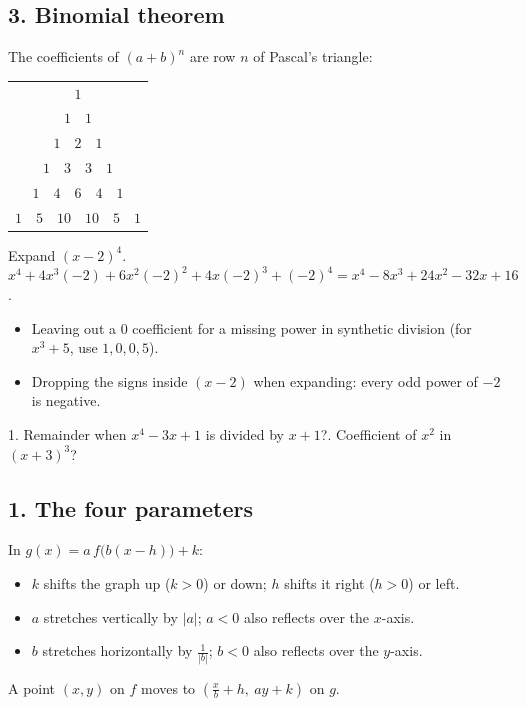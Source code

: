 \subsection*{3. Binomial theorem}
The coefficients of $(a+b)^n$ are row $n$ of Pascal's triangle:
\begin{center}\small
\begin{tabular}{c}
$1$\\ $1\quad1$\\ $1\quad2\quad1$\\ $1\quad3\quad3\quad1$\\ $1\quad4\quad6\quad4\quad1$\\ $1\quad5\quad10\quad10\quad5\quad1$
\end{tabular}
\end{center}
\begin{example}[Example 2]
Expand $(x-2)^4$.
\sol $x^4+4x^3(-2)+6x^2(-2)^2+4x(-2)^3+(-2)^4=x^4-8x^3+24x^2-32x+16$.
\end{example}

\begin{mistakes}
\begin{itemize}
\item Leaving out a $0$ coefficient for a missing power in synthetic division (for $x^3+5$, use $1,0,0,5$).
\item Dropping the signs inside $(x-2)$ when expanding: every odd power of $-2$ is negative.
\end{itemize}
\end{mistakes}

\begin{quickcheck}
1. Remainder when $x^4-3x+1$ is divided by $x+1$?. Coefficient of $x^2$ in $(x+3)^3$?
\end{quickcheck}


\subsection*{1. The four parameters}
\begin{keyidea}
In $g(x)=a\,f\big(b(x-h)\big)+k$:
\begin{itemize}
\item $k$ shifts the graph up ($k>0$) or down; $h$ shifts it right ($h>0$) or left.
\item $a$ stretches vertically by $|a|$; $a<0$ also reflects over the $x$-axis.
\item $b$ stretches horizontally by $\frac{1}{|b|}$; $b<0$ also reflects over the $y$-axis.
\end{itemize}
A point $(x,y)$ on $f$ moves to $\left(\frac{x}{b}+h,\ ay+k\right)$ on $g$.
\end{keyidea}

